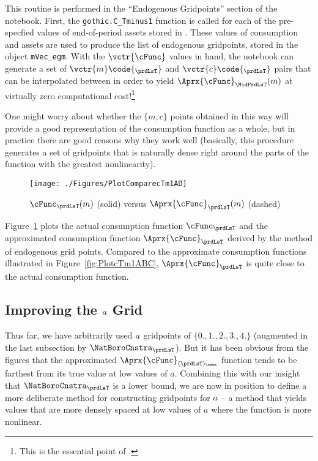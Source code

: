 \documentclass[SolvingMicroDSOPs]{subfiles}
\begin{document}
This routine is performed in the ``Endogenous Gridpoints'' section of the notebook. First, the \texttt{gothic.C\_Tminus1} function is called for each of the pre-specfied values of end-of-period assets stored in . These values of consumption and assets are used to produce the list of endogenous gridpoints, stored in the object \texttt{mVec\_egm}. With the $\vctr{\cFunc}$ values in hand, the notebook can generate a set of $\vctr{m}\code{_{\prdLsT}}$ and ${\vctr{\cNrm}\code{_{\prdLsT}}}$ pairs that can be interpolated between in order to yield $\Aprx{\cFunc}_{\MidPrdLsT}(\mNrm)$ at virtually zero computational cost!\footnote{This is the essential point of \cite{carrollEGM}.} %

\hypertarget{PlotComparecTm1AD}{}
One might worry about whether the $\{{m},c\}$ points obtained in this way will provide a good representation of the consumption function as a whole, but in practice there are good reasons why they work well (basically, this procedure generates a set of gridpoints that is naturally dense right around the parts of the function with the greatest nonlinearity).
\begin{figure}
  \centerline{\texttt{[image: ./Figures/PlotComparecTm1AD]}}
  \caption{$\cFunc_{\prdLsT}(m)$ (solid) versus $\Aprx{\cFunc}_{\prdLsT}(m)$ (dashed)}
  \label{fig:ComparecTm1AD}
\end{figure}
Figure~\ref{fig:ComparecTm1AD} plots the actual consumption function $\cFunc_{\prdLsT}$ and the approximated consumption function $\Aprx{\cFunc}_{\prdLsT}$ derived by the method of endogenous grid points. Compared to the approximate consumption functions illustrated in Figure~\ref{fig:PlotcTm1ABC}, $\Aprx{\cFunc}_{\prdLsT}$ is quite close to the actual consumption function.



\hypertarget{improving-the-a-grid}{}
\subsection{Improving the $a$ Grid}\label{subsec:improving-the-a-grid}

Thus far, we have arbitrarily used $a$ gridpoints of $\{0.,1.,2.,3.,4.\}$ (augmented in the last subsection by $\NatBoroCnstra_{\prdLsT}$).  But it has been obvious from the figures that the approximated $\Aprx{\cFunc}_{(\prdLsT)_\cntn}$ function tends to be farthest from its true value at low values of $a$.  Combining this with our insight that $\NatBoroCnstra_{\prdLsT}$ is a lower bound, we are now in position to define a more deliberate method for constructing gridpoints for $a$ -- a method that yields values that are more densely spaced at low values of $a$ where the function is more nonlinear.
\end{document}
